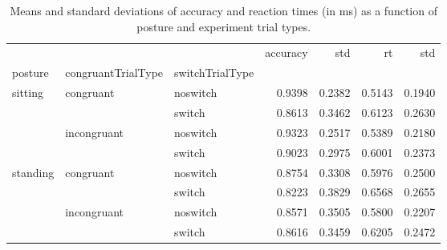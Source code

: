 \begin{table}
\centering
\caption{Means and standard deviations of accuracy and reaction times (in ms) as a function of posture and experiment trial types.}
\label{table-task-switching-replication-reaction-time}
\begin{tabular}{lllrrrr}
\toprule
         &             &        & accuracy &    std &     rt &    std \\
posture & congruantTrialType & switchTrialType &          &        &        &        \\
\midrule
sitting & congruant & noswitch &   0.9398 & 0.2382 & 0.5143 & 0.1940 \\
         &             & switch &   0.8613 & 0.3462 & 0.6123 & 0.2630 \\
         & incongruant & noswitch &   0.9323 & 0.2517 & 0.5389 & 0.2180 \\
         &             & switch &   0.9023 & 0.2975 & 0.6001 & 0.2373 \\
standing & congruant & noswitch &   0.8754 & 0.3308 & 0.5976 & 0.2500 \\
         &             & switch &   0.8223 & 0.3829 & 0.6568 & 0.2655 \\
         & incongruant & noswitch &   0.8571 & 0.3505 & 0.5800 & 0.2207 \\
         &             & switch &   0.8616 & 0.3459 & 0.6205 & 0.2472 \\
\bottomrule
\end{tabular}
\end{table}

